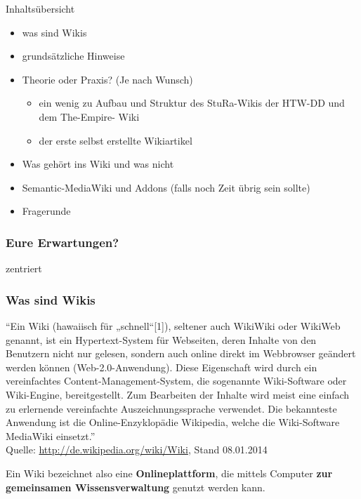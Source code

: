 \documentclass{beamer}
\begin{document}
\begin{frame}{Inhaltsübersicht}
  \begin{itemize}
    \item was sind Wikis
    \item grundsätzliche Hinweise
    \item Theorie oder Praxis? (Je nach Wunsch)
    \begin{itemize}
      \item ein wenig zu Aufbau und Struktur des StuRa-Wikis der HTW-DD und dem The-Empire- Wiki
      \item der erste selbst erstellte Wikiartikel
    \end{itemize}
    \item Was gehört ins Wiki und was nicht
    \item Semantic-MediaWiki und Addons (falls noch Zeit übrig sein sollte)
    \item Fragerunde
  \end{itemize}
\end{frame}


\begin{frame}
  \frametitle{Eure Erwartungen?}
  
  zentriert
  
\end{frame}


\begin{frame}
  \frametitle{Was sind Wikis}
  \begin{block}{}
    {\tiny “Ein Wiki (hawaiisch für „schnell“[1]), seltener auch WikiWiki
    oder WikiWeb genannt, ist ein Hypertext-System für Webseiten, deren
    Inhalte von den Benutzern nicht nur gelesen, sondern auch online direkt
    im Webbrowser geändert werden können (Web-2.0-Anwendung). Diese
    Eigenschaft wird durch ein vereinfachtes Content-Management-System, die
    sogenannte Wiki-Software oder Wiki-Engine, bereitgestellt. Zum
    Bearbeiten der Inhalte wird meist eine einfach zu erlernende
    vereinfachte Auszeichnungssprache verwendet. Die bekannteste Anwendung
    ist die Online-Enzyklopädie Wikipedia, welche die Wiki-Software
    MediaWiki einsetzt.” \\ Quelle: \url{http://de.wikipedia.org/wiki/Wiki}, Stand 08.01.2014}
  \end{block}
  \begin{block}{}
    Ein Wiki bezeichnet also eine \textbf{Onlineplattform}, die mittels
    Computer \textbf{zur gemeinsamen Wissensverwaltung} genutzt werden
    kann.
  \end{block}
\end{frame}
\end{document}
